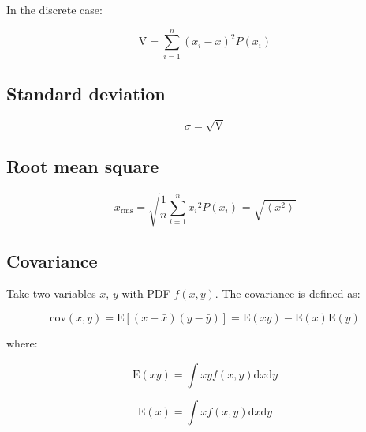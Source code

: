 In the discrete case:

\begin{equation}\label{eq:variance_discrete}
	\mathrm{V} = \sum_{i = 1}^{n}{(x_{i} - \bar{x})^{2} P(x_{i})}
\end{equation}

\subsection{Standard deviation}
\label{subsec:std_deviation}

\begin{equation}\label{eq:std_deviation}
	\sigma = \sqrt{\mathrm{V}}
\end{equation}

\subsection{Root mean square}
\label{subsec:rms}


\begin{equation}\label{eq:rms}
	x_{\mathrm{rms}} = \sqrt{\frac{1}{n}\sum_{i=1}^{n}{{x_{i}}^{2}} P(x_{i})} 
	= \sqrt{\left \langle x^{2} \right \rangle}
\end{equation} 

\subsection{Covariance}
\label{subsec:cov}

Take two variables $x$, $y$ with PDF $f(x, y)$. The covariance is defined as:

\begin{equation}\label{eq:cov}
	\mathrm{cov}\left( x, y \right) = \mathrm{E}\left[ (x - \bar{x}) (y - \bar{y}) \right] 
	= \mathrm{E}\left( xy \right) - \mathrm{E}\left( x \right) \mathrm{E}\left( y \right) 
\end{equation}

where: 

\begin{equation}
	\mathrm{E}\left( xy \right) = \int {xy f(x, y)}\mathrm{d}x \mathrm{d}y
\end{equation}

\begin{equation}
	\mathrm{E}\left( x \right) = \int {x f(x, y)}\mathrm{d}x \mathrm{d}y
\end{equation}

